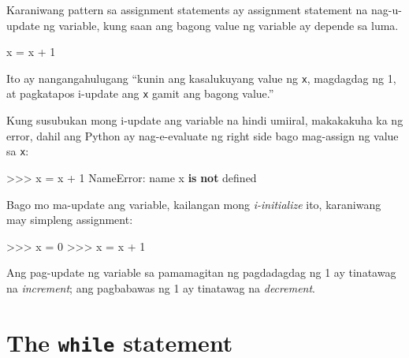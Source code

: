 \documentclass[10pt,]{book}
\newenvironment{Shaded}{}{}
\newcommand{\DecValTok}[1]{\textcolor[rgb]{0.25,0.63,0.44}{#1}}
\newcommand{\KeywordTok}[1]{\textcolor[rgb]{0.00,0.44,0.13}{\textbf{#1}}}
\newcommand{\NormalTok}[1]{#1}
\newcommand{\OperatorTok}[1]{\textcolor[rgb]{0.40,0.40,0.40}{#1}}
\newcommand{\PreprocessorTok}[1]{\textcolor[rgb]{0.74,0.48,0.00}{#1}}
\newcommand{\StringTok}[1]{\textcolor[rgb]{0.25,0.44,0.63}{#1}}
\begin{document}
Karaniwang pattern sa assignment statements ay assignment statement na
nag-u-update ng variable, kung saan ang bagong value ng variable ay
depende sa luma.

\begin{Shaded}
\begin{Highlighting}[]
\NormalTok{x }\OperatorTok{=}\NormalTok{ x }\OperatorTok{+} \DecValTok{1}
\end{Highlighting}
\end{Shaded}

Ito ay nangangahulugang ``kunin ang kasalukuyang value ng \texttt{x},
magdagdag ng 1, at pagkatapos i-update ang \texttt{x} gamit ang bagong
value.''

Kung susubukan mong i-update ang variable na hindi umiiral, makakakuha
ka ng error, dahil ang Python ay nag-e-evaluate ng right side bago
mag-assign ng value sa \texttt{x}:

\begin{Shaded}
\begin{Highlighting}[]
\OperatorTok{\textgreater{}\textgreater{}\textgreater{}}\NormalTok{ x }\OperatorTok{=}\NormalTok{ x }\OperatorTok{+} \DecValTok{1}
\PreprocessorTok{NameError}\NormalTok{: name }\StringTok{\textquotesingle{}x\textquotesingle{}} \KeywordTok{is} \KeywordTok{not}\NormalTok{ defined}
\end{Highlighting}
\end{Shaded}

Bago mo ma-update ang variable, kailangan mong \emph{i-initialize} ito,
karaniwang may simpleng assignment:


\begin{Shaded}
\begin{Highlighting}[]
\OperatorTok{\textgreater{}\textgreater{}\textgreater{}}\NormalTok{ x }\OperatorTok{=} \DecValTok{0}
\OperatorTok{\textgreater{}\textgreater{}\textgreater{}}\NormalTok{ x }\OperatorTok{=}\NormalTok{ x }\OperatorTok{+} \DecValTok{1}
\end{Highlighting}
\end{Shaded}

Ang pag-update ng variable sa pamamagitan ng pagdadagdag ng 1 ay
tinatawag na \emph{increment}; ang pagbabawas ng 1 ay tinatawag na
\emph{decrement}.

 

\section{\texorpdfstring{The \texttt{while}
statement}{The while statement}}\label{the-while-statement}
\end{document}
